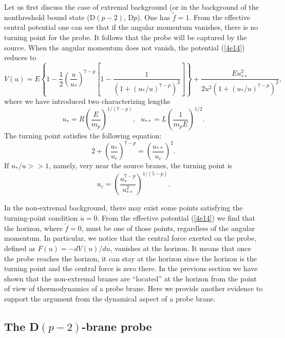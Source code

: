 \documentclass[a4paper,12pt]{article}
\begin{document}
Let us first discuss
the case of extremal background (or in the background of the nonthreshold
bound state (D$(p-2)$, D$p$). One has $\tilde{f}=1$. From the effective
central potential one can see that if the angular momentum vanishes,
there is no turning point for the probe. It follows that the probe will
be captured by the source. When the angular momentum does not vanish,
the potential (\ref{4e14}) reduces to
\begin{equation}
V(u)=E\left \{1-\frac{1}{2}\left(\frac{u}{u_*}\right)^{7-p}
 \left [1-\frac{1}{\left(1+(u_*/u)^{7-p}\right)^2}\right] \right\}
 +\frac{Eu_{**}^2}{2u^2 \left (1+(u_*/u)^{7-p}\right)^2},
\end{equation}
where we have introduced two characterizing lengths
\begin{equation}
u_*=R\left(\frac{E}{m_p}\right )^{1/(7-p)}, \ \ \
u_{**} = L\left(\frac{1}{m_pE}\right)^{1/2}.
\end{equation}
The turning point satisfies the following equation:
\begin{equation}
2 +\left(\frac{u_*}{u_c}\right)^{7-p} =\left(\frac{u_{**}}{u_c}\right)^2.
\end{equation}
If $u_*/u >>1$, namely, very near the source branes, the turning point
is
\begin{equation}
u_c= \left (\frac{u_*^{7-p}}{u_{**}^2}\right)^{1/(5-p)}.
\end{equation}

In the non-extremal background, there may exist some points satisfying
the turning-point condition $\dot{u}=0$. From the effective potential
(\ref{4e14}) we find that the horizon, where $\tilde{f}=0$, must be one
of those points, regardless of the angular momentum. In particular,
we notice that the central force exerted on the probe, defined as
$F(u)=-dV(u)/du$, vanishes at the horizon. It means that once
the probe reaches the horizon, it can stay at the horizon since the horizon
is the turning point and the central force is zero there. In the previous
section we have shown that the non-extremal branes are ``located''
at the horizon from the point of view of thermodynamics of a probe brane.
Here we provide another evidence to support the argument from the dynamical
aspect of a probe brane.


\subsection{The D$(p-2)$-brane probe}
\end{document}
